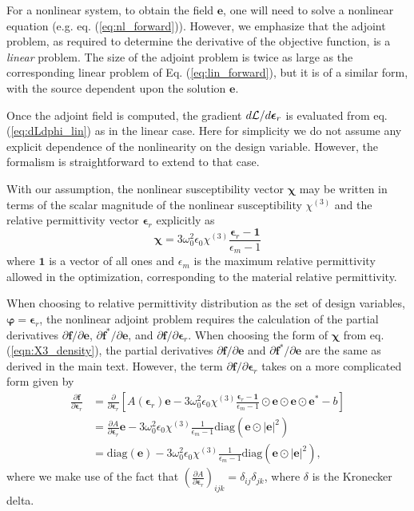 For a nonlinear system, to obtain the field $\mathbf{e}$, one will need to solve a nonlinear equation (e.g. eq. (\ref{eq:nl_forward})). However, we emphasize that the adjoint problem, as required to determine the derivative of the objective function, is a \textit{linear} problem. The size of the adjoint problem is twice as large as the corresponding linear problem of Eq. (\ref{eq:lin_forward}), but it is of a similar form, with the source dependent upon the solution $\mathbf{e}$.   

Once the adjoint field is computed, the gradient $d\mathcal{L}/d\bm{\epsilon}_r$ is evaluated from eq. (\ref{eq:dLdphi_lin}) as in the linear case.  Here for simplicity we do not assume any explicit dependence of the nonlinearity on the design variable. However, the formalism is straightforward to extend to that case.

With our assumption, the nonlinear susceptibility vector $\bm{\chi}$ may be written in terms of the scalar magnitude of the nonlinear susceptibility $\chi^{(3)}$ and the relative permittivity vector $\bm{\epsilon}_r$ explicitly as
%
\begin{equation}
\bm{\chi} = 3\omega_0^2\epsilon_0 \chi^{(3)}\frac{\bm{\epsilon}_r - \mathbf{1}}{\epsilon_m - 1}
\label{eqn:X3_density}
\end{equation}
%
where $\mathbf{1}$ is a vector of all ones and $\epsilon_m$ is the maximum relative permittivity allowed in the optimization, corresponding to the material relative permittivity.

When choosing to relative permittivity distribution as the set of design variables, $\bm{\varphi} = \bm{\epsilon}_r$, the nonlinear adjoint problem requires the calculation of the partial derivatives $\partial \mathbf{f} / \partial \mathbf{e}$, $\partial \mathbf{f}^* / \partial \mathbf{e}$, and $\partial \mathbf{f} / \partial \bm{\epsilon}_r$.  When choosing the form of $\bm{\chi}$ from eq. (\ref{eqn:X3_density}), the partial derivatives $\partial \mathbf{f} / \partial \mathbf{e}$ and $\partial \mathbf{f}^* / \partial \mathbf{e}$ are the same as derived in the main text.  However, the term $\partial \mathbf{f} / \partial \bm{\epsilon}_r$ takes on a more complicated form given by
%
\begin{align}
\frac{\partial \mathbf{f}}{\partial \bm{\epsilon}_r} &= \frac{\partial}{\partial \bm{\epsilon}_r} \left[ A(\bm{\epsilon}_r)\mathbf{e} - 3\omega_0^2\epsilon_0 \chi^{(3)}\frac{\bm{\epsilon}_r - \mathbf{1}}{\epsilon_m - 1} \odot \mathbf{e} \odot \mathbf{e} \odot \mathbf{e}^* - b \right] \\ 
&= \frac{\partial A}{\partial \bm{\epsilon}_r}\mathbf{e}  - 3\omega_0^2\epsilon_0 \chi^{(3)}\frac{1}{\epsilon_m - 1} \textrm{diag}\left( \mathbf{e} \odot |\mathbf{e}|^2 \right) \\
&= \textrm{diag}\left( \mathbf{e} \right)  - 3\omega_0^2\epsilon_0 \chi^{(3)}\frac{1}{\epsilon_m - 1} \textrm{diag}\left( \mathbf{e} \odot |\mathbf{e}|^2 \right),
\label{eqn:prop_dfdp}
\end{align}
where we make use of the fact that $\left(\frac{\partial A}{\partial \bm{\epsilon}_r}\right)_{ijk} = \delta_{ij}\delta_{jk}$, where $\delta$ is the Kronecker delta.


